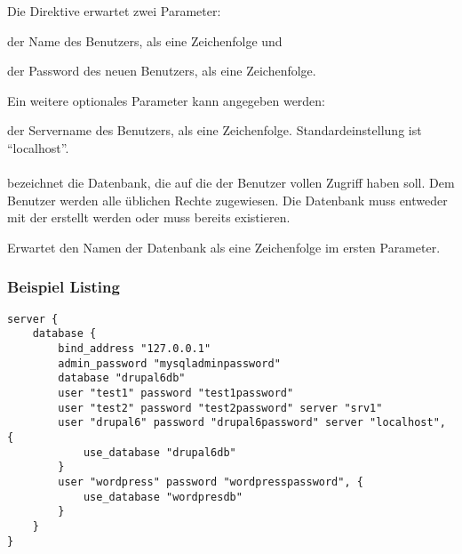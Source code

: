 Die Direktive erwartet zwei Parameter:

\begin{asparadesc}
\item[\code{user}] der Name des Benutzers, als eine Zeichenfolge und
\item[\code{password}] der Password des neuen Benutzers, als eine Zeichenfolge.
\end{asparadesc}

Ein weitere optionales Parameter kann angegeben werden:

\begin{asparadesc}
\item[\code{server}] der Servername des Benutzers, als eine Zeichenfolge. Standardeinstellung
ist ``localhost''.
\end{asparadesc}

\paragraph{}

bezeichnet die Datenbank, die auf die der Benutzer vollen Zugriff haben soll. Dem Benutzer
werden alle üblichen Rechte zugewiesen. Die Datenbank muss entweder mit der 
erstellt werden oder muss bereits existieren.

Erwartet den Namen der Datenbank als eine Zeichenfolge im ersten Parameter.

\subsubsection*{Beispiel Listing}

\begin{lstlisting}[style=Java, caption=Beispiel Database Script]
server {
    database {
        bind_address "127.0.0.1"
        admin_password "mysqladminpassword"
        database "drupal6db"
        user "test1" password "test1password"
        user "test2" password "test2password" server "srv1"
        user "drupal6" password "drupal6password" server "localhost", {
            use_database "drupal6db"
        }
        user "wordpress" password "wordpresspassword", {
            use_database "wordpresdb"
        }
    }
}
\end{lstlisting}

